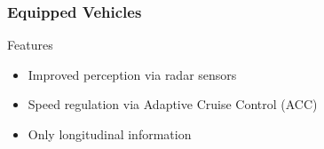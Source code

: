 \begin{frame}
\frametitle{Equipped Vehicles}
    \begin{center}
        \resizebox{0.9\linewidth}{!}{%
            
        }
        \begin{exampleblock}{Features}
            \begin{itemize}
                \item Improved perception via radar sensors
                \item Speed regulation via Adaptive Cruise Control (ACC)
                \item Only longitudinal information 
            \end{itemize}
        \end{exampleblock}
    \end{center}
\end{frame}